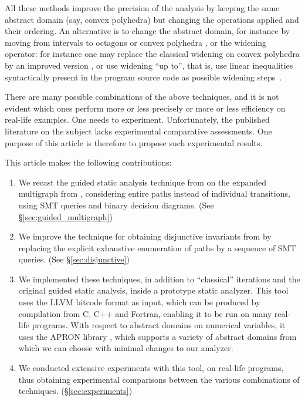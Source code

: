 \documentclass[preprint]{sigplanconf}
\begin{document}
All these methods improve the precision of the analysis by keeping the same abstract domain (say, convex polyhedra) but changing the operations applied and their ordering. An alternative is to change the abstract domain, for instance by moving from intervals to octagons or convex polyhedra \cite{DBLP:journals/lisp/Mine06,Mine_PhD}, or the widening operator: for instance one may replace the classical widening on convex polyhedra \cite{CousotHalbwachs78,Halbwachs_PhD} by an improved version \cite{BagnaraHRZ05SCP}, or use widening ``up to'', that is, use linear inequalities syntactically present in the program source code as possible widening steps~\cite{Polka:FMSD:97}.

There are many possible combinations of the above techniques, and it is not evident which ones perform more or less precisely or more or less efficiency on real-life examples. One needs to experiment. Unfortunately, the published literature on the subject lacks experimental comparative assessments. One purpose of this article is therefore to propose such experimental results.
\medskip

This article makes the following contributions:
\begin{enumerate}
\item We recast the guided static analysis technique from \citet{DBLP:conf/sas/GopanR07} on the expanded multigraph from \citet{Monniaux_Gonnord_SAS11}, considering entire paths instead of individual transitions, using SMT queries and binary decision diagrams.\label{contr:guided_multigraph} (See \S\ref{sec:guided_multigraph})
\item We improve the technique for obtaining disjunctive invariants from \citet{DBLP:conf/pldi/GulwaniZ10} by replacing the explicit exhaustive enumeration of paths by a sequence of SMT queries.\label{contr:disjunctive} (See \S\ref{sec:disjunctive})
\item We implemented these techniques, in addition to ``classical'' iterations and the original guided static analysis, inside a prototype static analyzer.
This tool uses the LLVM bitcode format \cite{Lattner:2004:LCF:977395.977673,LLVM_langref} as input, which can be produced by compilation from C, C++ and Fortran, enabling it to be run on many real-life programs.
With respect to abstract domains on numerical variables, it uses the APRON library \cite{DBLP:conf/cav/JeannetM09}, which supports a variety of abstract domains from which we can choose with minimal changes to our analyzer.
\item We conducted extensive experiments with this tool, on real-life programs, thus obtaining experimental comparisons between the various combinations of techniques. (\S\ref{sec:experiments})
\end{enumerate}
\end{document}
